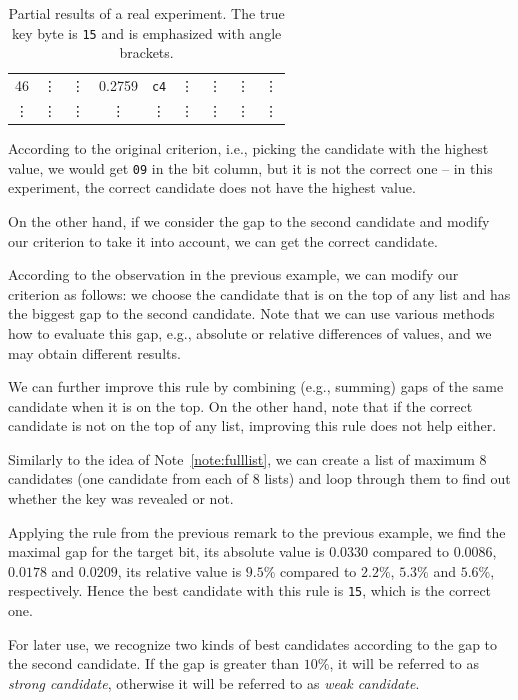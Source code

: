\begin{example}
\begin{table}[H]
\begin{center}
\begin{tabular}{| c | c | c | c | c | c | c | c | c |}
					46     & \vdots & \vdots     & 0.2759 & {\tt c4}   & \vdots & \vdots     & \vdots & \vdots     \\
					\vdots & \vdots & \vdots     & \vdots & \vdots     & \vdots & \vdots     & \vdots & \vdots     \\
				\hline
			\end{tabular}
			\end{center}
		\caption{Partial results of a real experiment. The true key byte is {\tt 15} and is emphasized with angle brackets.}
		\label{tab:gap}
		\end{table}
		According to the original criterion, i.e., picking the candidate with the highest value, we would get {\tt 09} in the  bit column, but it is not the correct one -- in this experiment, the correct candidate does not have the highest value.
		
		On the other hand, if we consider the gap to the second candidate and modify our criterion to take it into account, we can get the correct candidate.
	\end{example}
	
	\begin{remark}
	\label{rem:gap}
		According to the observation in the previous example, we can modify our criterion as follows: we choose the candidate that is on the top of any list and has the biggest gap to the second candidate. Note that we can use various methods how to evaluate this gap, e.g., absolute or relative differences of values, and we may obtain different results.
		
		We can further improve this rule by combining (e.g., summing) gaps of the same candidate when it is on the top. On the other hand, note that if the correct candidate is not on the top of any list, improving this rule does not help either.
		
		Similarly to the idea of Note~\ref{note:fulllist}, we can create a list of maximum $8$ candidates (one candidate from each of $8$ lists) and loop through them to find out whether the key was revealed or not.
	\end{remark}
	
	Applying the rule from the previous remark to the previous example, we find the maximal gap for the  target bit, its absolute value is $0.0330$ compared to $0.0086$, $0.0178$ and $0.0209$, its relative value is $9.5\%$ compared to $2.2\%$, $5.3\%$ and $5.6\%$, respectively. Hence the best candidate with this rule is {\tt 15}, which is the correct one.
	
	\begin{note}
	\label{note:strong}
		For later use, we recognize two kinds of best candidates according to the gap to the second candidate. If the gap is greater than $10\%$, it will be referred to as {\em strong candidate}, otherwise it will be referred to as {\em weak candidate}.
	\end{note}